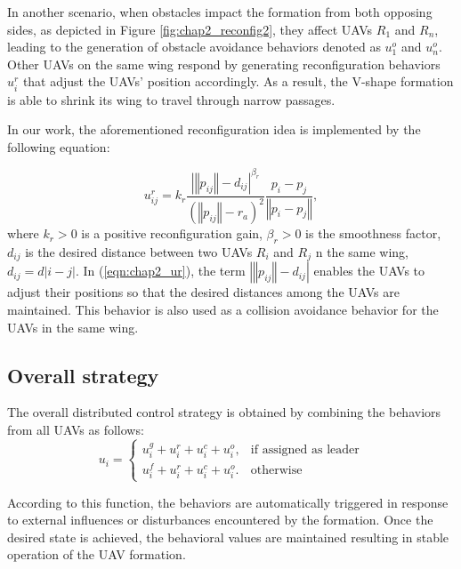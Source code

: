 In another scenario, when obstacles impact the formation from both opposing sides, as depicted in Figure \ref{fig:chap2_reconfig2}, they affect UAVs $R_1$ and $R_n$, leading to the generation of obstacle avoidance behaviors denoted as $u_1^o$ and $u_n^o$. Other UAVs on the same wing respond by generating reconfiguration behaviors $u_i^r$ that adjust the UAVs' position accordingly. As a result, the V-shape formation is able to shrink its wing to travel through narrow passages.

In our work, the aforementioned reconfiguration idea is implemented by the following equation:

\begin{equation}
    u_{ij}^{r}=k_{r}\dfrac{\left|\left\Vert p_{ij}\right\Vert -d_{ij}\right|^{\beta_r}}{\left(\left\Vert p_{ij}\right\Vert -r_{a}\right)^{2}}\dfrac{p_i-p_j}{\left\Vert p_i-p_j\right\Vert},
    \label{eqn:chap2_ur}
\end{equation}
where $k_r>0$ is a positive reconfiguration gain, $\beta_r>0$ is the smoothness factor, $d_{ij}$ is the desired distance between two UAVs $R_i$ and $R_j$ n the same wing, $d_{ij}=d\left\vert i-j\right\vert$. In (\ref{eqn:chap2_ur}), the term $\left|\left\Vert p_{ij}\right\Vert -d_{ij}\right|$ enables the UAVs to adjust their positions so that the desired distances among the UAVs are maintained. This behavior is also used as a collision avoidance behavior for the UAVs in the same wing.

\subsection{Overall strategy}
The overall distributed control strategy is obtained by combining the behaviors from all UAVs as follows:%
\begin{equation}
    u_{i}=\left\{ \begin{array}{cc}
u_{i}^{g}+u_{i}^{r}+u_{i}^{c}+u_{i}^{o}, & \text{if assigned as leader}\\
u_{i}^{f}+u_{i}^{r}+u_{i}^{c}+u_{i}^{o}. & \text{otherwise}
\end{array}\right.
\end{equation}

According to this function, the behaviors are automatically triggered in response to external influences or disturbances encountered by the formation. Once the desired state is achieved, the behavioral values are maintained resulting in stable operation of the UAV formation.